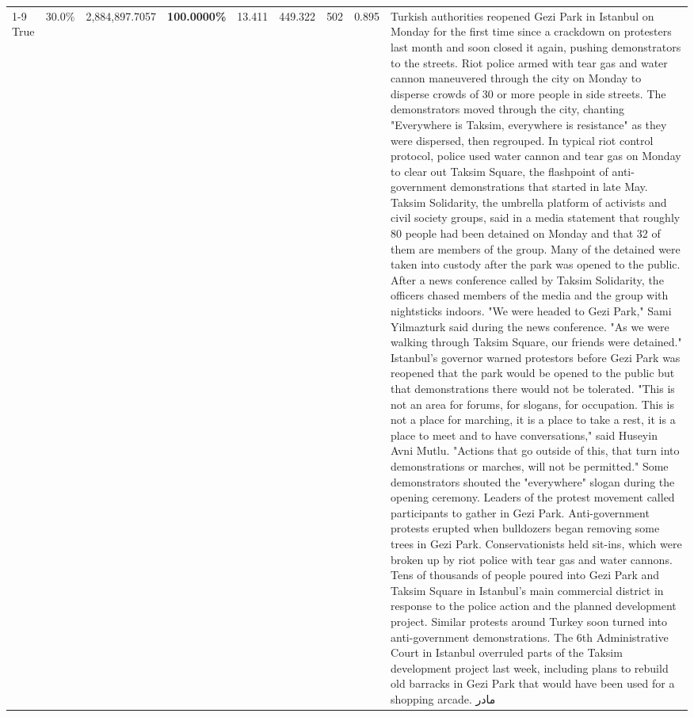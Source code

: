 \begin{table}[H]
\begin{tabular}{lllrlllll}
\cline{1-9}
True & 30.0\% & 2,884,897.7057 & \bfseries \color{red} 100.0000\% & 13.411 & 449.322 & 502 & 0.895 & Turkish authorities reopened Gezi Park in Istanbul on Monday for the first time since a crackdown on protesters last month and soon closed it again, pushing demonstrators to the streets. Riot police armed with tear gas and water cannon maneuvered through the city on Monday to disperse crowds of 30 or more people in side streets. The demonstrators moved through the city, chanting "Everywhere is Taksim, everywhere is resistance" as they were dispersed, then regrouped. In typical riot control protocol, police used water cannon and tear gas on Monday to clear out Taksim Square, the flashpoint of anti-government demonstrations that started in late May. Taksim Solidarity, the umbrella platform of activists and civil society groups, said in a media statement that roughly 80 people had been detained on Monday and that 32 of them are members of the group. Many of the detained were taken into custody after the park was opened to the public. After a news conference called by Taksim Solidarity, the officers chased members of the media and the group with nightsticks indoors. "We were headed to Gezi Park," Sami Yilmazturk said during the news conference. "As we were walking through Taksim Square, our friends were detained." Istanbul's governor warned protestors before Gezi Park was reopened that the park would be opened to the public but that demonstrations there would not be tolerated. "This is not an area for forums, for slogans, for occupation. This is not a place for marching, it is a place to take a rest, it is a place to meet and to have conversations," said Huseyin Avni Mutlu. "Actions that go outside of this, that turn into demonstrations or marches, will not be permitted." Some demonstrators shouted the "everywhere" slogan during the opening ceremony. Leaders of the protest movement called participants to gather in Gezi Park. Anti-government protests erupted when bulldozers began removing some trees in Gezi Park. Conservationists held sit-ins, which were broken up by riot police with tear gas and water cannons. Tens of thousands of people poured into Gezi Park and Taksim Square in Istanbul's main commercial district in response to the police action and the planned development project. Similar protests around Turkey soon turned into anti-government demonstrations. The 6th Administrative Court in Istanbul overruled parts of the Taksim development project last week, including plans to rebuild old barracks in Gezi Park that would have been used for a shopping arcade. مادر \\

\end{tabular}
\end{table}
